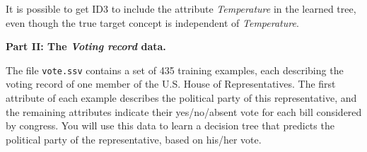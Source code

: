 \item[4.]
It is possible to get ID3 to include the attribute {\em Temperature} in the
learned tree, even though the true target concept is independent of {\em
Temperature}.
\ee

\vspace{.3in}

\noindent
{\large \bf Part II: The {\em Voting record} data.}

\vspace{.1in}

\noindent
The file {\tt vote.ssv} contains a set of 435 training examples, each
describing the voting record of one member of the U.S. House of
Representatives.  The first attribute of each example describes the political
party of this representative, and the remaining attributes indicate their
yes/no/absent vote for each bill considered by congress.  You will use this
data to learn a decision tree that predicts the political party of the
representative, based on his/her vote.


